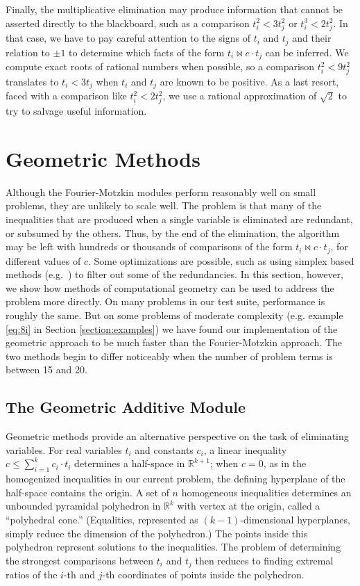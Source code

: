 \documentclass[runningheds]{llncs}
\newcommand{\RR}{\mathbb{R}}
\begin{document}
Finally, the multiplicative elimination may produce information that
cannot be asserted directly to the blackboard, such as a comparison
$t_i^2 < 3 t_j^2$ or $t_i^3 < 2 t_j^2$. In that case, we have to pay
careful attention to the signs of $t_i$ and $t_j$ and their relation
to $\pm 1$ to determine which facts of the form $t_i \bowtie c \cdot t_j$ can be inferred. We compute exact roots of rational numbers when possible, so a comparison $t_i^2 < 9 t_j^2$ translates to $t_i < 3 t_j$ when $t_i$ and $t_j$ are known to be positive. As a last resort, faced with a comparison like $t_i^2 < 2 t_j^2$, we use a rational approximation of $\sqrt 2$ to try to salvage useful information.

\section{Geometric Methods}
\label{section:geometric}

Although the Fourier-Motzkin modules perform reasonably well on small problems, they are unlikely to scale well. The problem is that many of the inequalities that are produced when a single variable is eliminated are redundant, or subsumed by the others. Thus, by the end of the elimination, the algorithm may be left with hundreds or thousands of comparisons of the form $t_i \bowtie c\cdot t_j$, for different values of $c$. Some optimizations are possible, such as using simplex based methods (e.g.~\cite{dutertre:de:moura:06}) to filter out some of the redundancies. In this section, however, we show how methods of computational geometry can be used to address the problem more directly. On many problems in our test suite, performance is roughly the same. But on some problems of moderate complexity (e.g. example \ref{eq:8i} in Section \ref{section:examples}) we have found our implementation of the geometric approach to be much faster than the Fourier-Motzkin approach. The two methods begin to differ noticeably when the number of problem terms is between 15 and 20. 

\subsection{The Geometric Additive Module}
\label{subsection:additive:geometric}
Geometric methods provide an alternative perspective on the task of
eliminating variables. For real variables $t_i$ and constants $c_i$, a linear inequality $c \leq \sum_{i=1}^k c_i
\cdot t_i$ determines a half-space in $\RR^{k+1}$; when $c=0$, as in the
homogenized inequalities in our current problem, the defining
hyperplane of the half-space contains the origin. A set of $n$
homogeneous inequalities determines an unbounded pyramidal polyhedron
in $\RR^k$ with vertex at the origin, called a ``polyhedral cone.'' (Equalities, represented as $(k-1)$-dimensional hyperplanes, simply reduce the dimension of the polyhedron.) The points inside this polyhedron represent solutions to the inequalities. The problem of determining the strongest comparisons between $t_i$ and $t_j$ then reduces to finding extremal ratios of the $i$-th and $j$-th coordinates of points inside the polyhedron.
\end{document}
